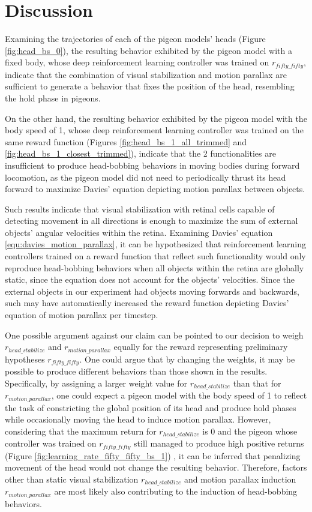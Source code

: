 \chapter{Discussion} \label{ch:discussion}
  Examining the trajectories of each of the pigeon models' heads (Figure \ref{fig:head_bs_0}), the resulting behavior exhibited by the pigeon model with a fixed body, whose deep reinforcement learning controller was trained on $r_{fifty\_fifty}$, indicate that the combination of visual stabilization and motion parallax are sufficient to generate a behavior that fixes the position of the head, resembling the hold phase in pigeons.

  On the other hand, the resulting behavior exhibited by the pigeon model with the body speed of 1, whose deep reinforcement learning controller was trained on the same reward function (Figures \ref{fig:head_bs_1_all_trimmed} and \ref{fig:head_bs_1_closest_trimmed}), indicate that the 2 functionalities are insufficient to produce head-bobbing behaviors in moving bodies during forward locomotion, as the pigeon model did not need to periodically thrust its head forward to maximize Davies' equation depicting motion parallax between objects.

  Such results indicate that visual stabilization with retinal cells capable of detecting movement in all directions is enough to maximize the sum of external objects' angular velocities within the retina.
    Examining Davies' equation \ref{equ:davies_motion_parallax}, it can be hypothesized that reinforcement learning controllers trained on a reward function that reflect such functionality would only reproduce head-bobbing behaviors when all objects within the retina are globally static, since the equation does not account for the objects' velocities.
    Since the external objects in our experiment had objects moving forwards and backwards, such may have automatically increased the reward function depicting Davies' equation of motion parallax per timestep.


  One possible argument against our claim can be pointed to our decision to weigh $r_{head\_stabilize}$ and $r_{motion\_parallax}$ equally for the reward representing preliminary hypotheses $r_{fifty\_fifty}$. One could argue that by changing the weights, it may be possible to produce different behaviors than those shown in the results.
  Specifically, by assigning a larger weight value for $r_{head\_stabilize}$ than that for $r_{motion\_parallax}$, one could expect a pigeon model with the body speed of 1 to reflect the task of constricting the global position of its head and produce hold phases while occasionally moving the head to induce motion parallax.
  However, considering that the maximum return for $r_{head\_stabilize}$ is 0 and the pigeon whose controller was trained on $r_{fifty\_fifty}$ still managed to produce high positive returns (Figure \ref{fig:learning_rate_fifty_fifty_bs_1}) , it can be inferred that penalizing movement of the head would not change the resulting behavior.
  Therefore, factors other than static visual stabilization $r_{head\_stabilize}$ and motion parallax induction $r_{motion\_parallax}$ are most likely also contributing to the induction of head-bobbing behaviors.

